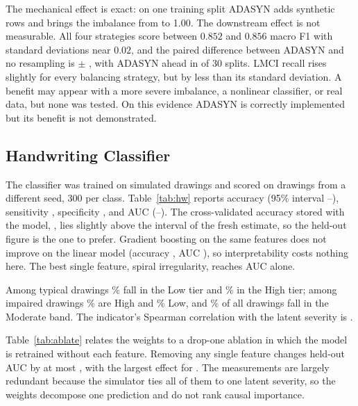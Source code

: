 \documentclass[conference]{IEEEtran}
\begin{document}


The mechanical effect is exact: on one training split ADASYN adds \AdasynSynth{} synthetic rows and brings the imbalance from \AdasynBefore{} to 1.00. The downstream effect is not measurable. All four strategies score between $0.852$ and $0.856$ macro F1 with standard deviations near $0.02$, and the paired difference between ADASYN and no resampling is \AdasynDelta{} $\pm$ \AdasynDeltaSd{}, with ADASYN ahead in \AdasynWins{} of 30 splits. LMCI recall rises slightly for every balancing strategy, but by less than its standard deviation. A benefit may appear with a more severe imbalance, a nonlinear classifier, or real data, but none was tested. On this evidence ADASYN is correctly implemented but its benefit is not demonstrated.
\subsection{Handwriting Classifier}
The classifier was trained on \HwTrainN{} simulated drawings and scored on \HwHeldN{} drawings from a different seed, 300 per class. Table~\ref{tab:hw} reports accuracy \HwAcc{} (95\% interval \HwAccLo--\HwAccHi), sensitivity \HwSens{}, specificity \HwSpec{}, and AUC \HwAuc{} (\HwAucLo--\HwAucHi). The cross-validated accuracy stored with the model, \HwCvAcc{}, lies slightly above the interval of the fresh estimate, so the held-out figure is the one to prefer. Gradient boosting on the same features does not improve on the linear model (accuracy \HwGbAcc{}, AUC \HwGbAuc{}), so interpretability costs nothing here. The best single feature, spiral irregularity, reaches AUC \HwBestSingle{} alone.



Among typical drawings \HwTypLow\% fall in the Low tier and \HwTypHigh\% in the High tier; among impaired drawings \HwImpHigh\% are High and \HwImpLow\% Low, and \HwModShare\% of all drawings fall in the Moderate band. The indicator's Spearman correlation with the latent severity is \HwRho{}.

Table~\ref{tab:ablate} relates the weights to a drop-one ablation in which the model is retrained without each feature. Removing any single feature changes held-out AUC by at most \HwMaxDrop{}, with the largest effect for \HwMaxDropName{}. The measurements are largely redundant because the simulator ties all of them to one latent severity, so the weights decompose one prediction and do not rank causal importance.


\end{document}

